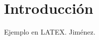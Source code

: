 \documentclass[a4paper. 12pt]{article}
\begin{document}
\section{Introducción}
  Ejemplo en LATEX. Jiménez.
\end{document}
